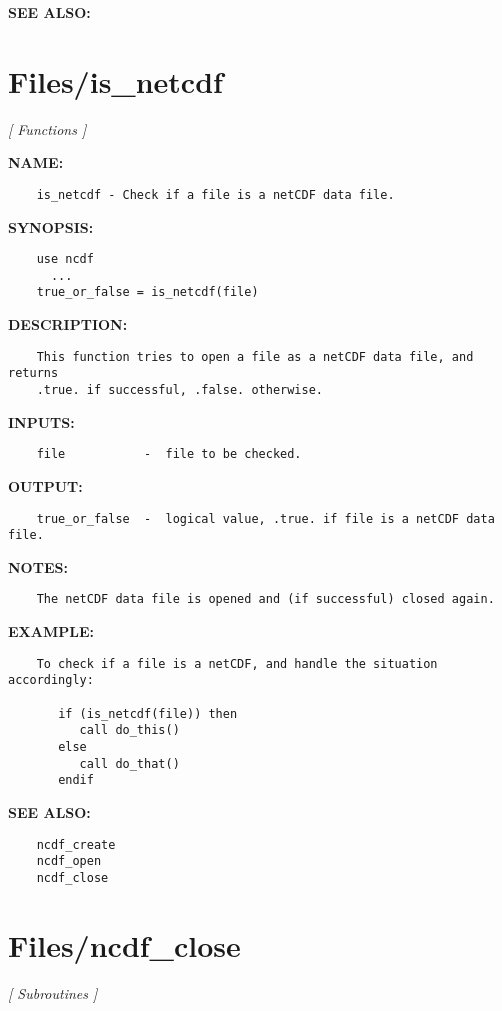 \textbf{SEE ALSO:}\hspace{0.08in}\section{Files/is\_netcdf}
\textsl{[ Functions ]}

\label{ch:robo58}
\label{ch:Files_is_netcdf}
\textbf{NAME:}\hspace{0.08in}\begin{Verbatim}
    is_netcdf - Check if a file is a netCDF data file.
\end{Verbatim}
\textbf{SYNOPSIS:}\hspace{0.08in}\begin{Verbatim}
    use ncdf
      ...
    true_or_false = is_netcdf(file)
\end{Verbatim}
\textbf{DESCRIPTION:}\hspace{0.08in}\begin{Verbatim}
    This function tries to open a file as a netCDF data file, and returns
    .true. if successful, .false. otherwise.
\end{Verbatim}
\textbf{INPUTS:}\hspace{0.08in}\begin{Verbatim}
    file           -  file to be checked.
\end{Verbatim}
\textbf{OUTPUT:}\hspace{0.08in}\begin{Verbatim}
    true_or_false  -  logical value, .true. if file is a netCDF data file.
\end{Verbatim}
\textbf{NOTES:}\hspace{0.08in}\begin{Verbatim}
    The netCDF data file is opened and (if successful) closed again.
\end{Verbatim}
\textbf{EXAMPLE:}\hspace{0.08in}\begin{Verbatim}
    To check if a file is a netCDF, and handle the situation accordingly:

       if (is_netcdf(file)) then
          call do_this()
       else
          call do_that()
       endif
\end{Verbatim}
\textbf{SEE ALSO:}\hspace{0.08in}\begin{Verbatim}
    ncdf_create
    ncdf_open
    ncdf_close
\end{Verbatim}
\section{Files/ncdf\_close}
\textsl{[ Subroutines ]}

